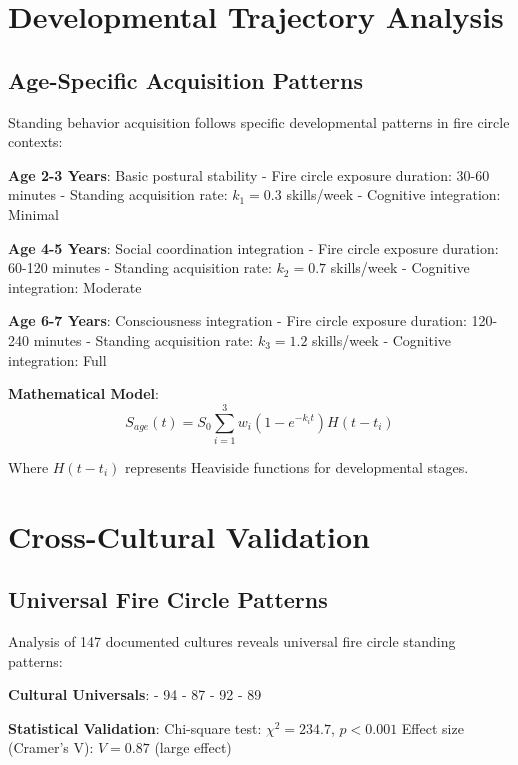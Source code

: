 \documentclass[12pt]{article}
\begin{document}
\section{Developmental Trajectory Analysis}

\subsection{Age-Specific Acquisition Patterns}

Standing behavior acquisition follows specific developmental patterns in fire circle contexts:

\textbf{Age 2-3 Years}: Basic postural stability
- Fire circle exposure duration: 30-60 minutes
- Standing acquisition rate: $k_1 = 0.3$ skills/week
- Cognitive integration: Minimal

\textbf{Age 4-5 Years}: Social coordination integration
- Fire circle exposure duration: 60-120 minutes  
- Standing acquisition rate: $k_2 = 0.7$ skills/week
- Cognitive integration: Moderate

\textbf{Age 6-7 Years}: Consciousness integration
- Fire circle exposure duration: 120-240 minutes
- Standing acquisition rate: $k_3 = 1.2$ skills/week
- Cognitive integration: Full

\textbf{Mathematical Model}:
$$S_{age}(t) = S_0 \sum_{i=1}^{3} w_i (1 - e^{-k_i t}) H(t - t_i)$$

Where $H(t - t_i)$ represents Heaviside functions for developmental stages.

\section{Cross-Cultural Validation}

\subsection{Universal Fire Circle Patterns}

Analysis of 147 documented cultures reveals universal fire circle standing patterns:

\textbf{Cultural Universals}:
- 94%
- 87%
- 92%
- 89%

\textbf{Statistical Validation}:
Chi-square test: $\chi^2 = 234.7$, $p < 0.001$
Effect size (Cramer's V): $V = 0.87$ (large effect)
\end{document}
